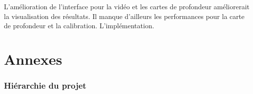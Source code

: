\documentclass{article}
\begin{document}
L'amélioration de l'interface pour la vidéo et les cartes de profondeur améliorerait la visualisation des résultats. 
Il manque d'ailleurs les performances pour la carte de profondeur et la calibration.
L'implémentation.


\newpage
\appendix
\part{Annexes}

\listoffigures

\newpage
\section{Hiérarchie du projet}

\end{document}
